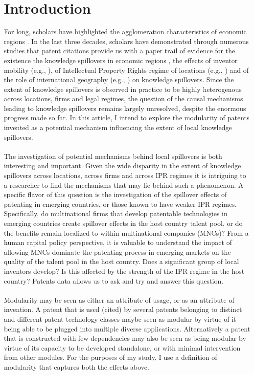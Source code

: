 \documentclass[12pt]{article}
\begin{document}
\section{Introduction}
For long, scholars have  highlighted the agglomeration characteristics of economic regions \citep{Marshall1890}. In the last three decades, scholars have demonstrated through numerous studies that patent citations provide us with a paper trail of evidence for the existence the knowledge spillovers in economic regions \citep{Jaffe1993, Almeida1999},  the effects of inventor mobility (e.g., \cite{Almeida1999}), of Intellectual Property Rights regime of locations (e.g., \cite{Zhao2006}) and of the role of international geography (e.g., \cite{Singh2007}) on knowledge spillovers. Since the extent of knowledge spillovers is observed in practice to be highly heterogenous across locations, firms and legal regimes, the question of the causal mechanisms leading to knowledge spillovers remains largely unresolved, despite the enormous progress made so far. In this article, I intend to explore the modularity of patents invented as a potential mechanism influencing the extent of local knowledge spillovers.
\\\\
The investigation of potential mechanisms behind local spillovers is both interesting and important. Given the wide disparity in the extent of knowledge spillovers across locations, across firms and across IPR regimes it is intriguing to a researcher to find the mechanisms that may lie behind such a phenomenon. A specific flavor of this question is the investigation of the spillover effects of patenting in emerging countries, or those known to have weaker IPR regimes. Specifically, do multinational firms that develop patentable technologies in emerging countries create spillover effects in the host country talent pool, or do the benefits remain localized to within multinational companies (MNCs)? From a human capital policy perspective, it is valuable to understand the impact of allowing MNCs dominate the patenting process in emerging markets on the quality of the talent pool in the host country. Does a significant group of local inventors develop? Is this affected by the strength of the IPR regime in the host country? Patents data allows us to ask and try and answer this question. 
\\\\
Modularity may be seen as either an attribute of usage, or as an attribute of invention. A patent that is used (cited) by several patents belonging to distinct and different patent technology classes maybe seen as modular by virtue of it being able to be plugged into multiple diverse applications. Alternatively a patent that is constructed with few dependencies may also be seen as being modular by virtue of its capacity to be developed standalone, or with minimal intervention from other modules. For the purposes of my study, I use a definition of modularity that captures both the effects above. 
\end{document}

